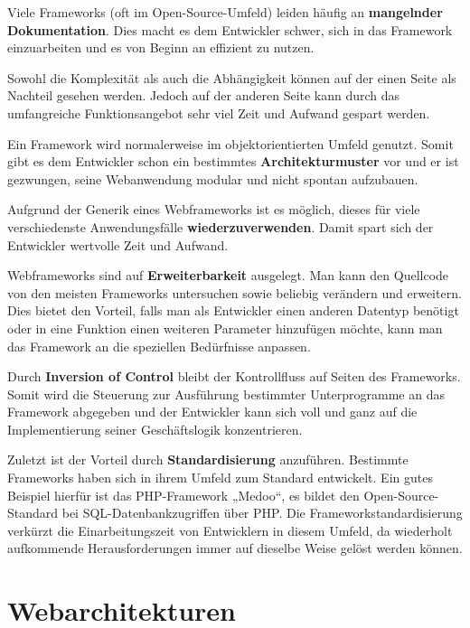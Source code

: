Viele Frameworks (oft im Open-Source-Umfeld) leiden häufig an \textbf{mangelnder Dokumentation}. Dies macht es dem Entwickler schwer, sich in das Framework einzuarbeiten und es von Beginn an effizient zu nutzen.

Sowohl die Komplexität als auch die Abhängigkeit können auf der einen Seite als Nachteil gesehen werden. Jedoch auf der anderen Seite kann durch das umfangreiche Funktionsangebot sehr viel Zeit und Aufwand gespart werden.

Ein Framework wird normalerweise im objektorientierten Umfeld genutzt. Somit gibt es dem Entwickler schon ein bestimmtes \textbf{Architekturmuster} vor und er ist gezwungen, seine Webanwendung modular und nicht spontan aufzubauen.

Aufgrund der Generik eines Webframeworks ist es möglich, dieses für viele verschiedenste Anwendungsfälle \textbf{wiederzuverwenden}. Damit spart sich der Entwickler wertvolle Zeit und Aufwand.

Webframeworks sind auf \textbf{Erweiterbarkeit} ausgelegt. Man kann den Quellcode von den meisten Frameworks untersuchen sowie beliebig verändern und erweitern. Dies bietet den Vorteil, falls man als Entwickler einen anderen Datentyp benötigt oder in eine Funktion einen weiteren Parameter hinzufügen möchte, kann man das Framework an die speziellen Bedürfnisse anpassen.

Durch \textbf{Inversion of Control} bleibt der Kontrollfluss auf Seiten des Frameworks. Somit wird die Steuerung zur Ausführung bestimmter Unterprogramme an das Framework abgegeben und der Entwickler kann sich voll und ganz auf die Implementierung seiner Geschäftslogik konzentrieren.

Zuletzt ist der Vorteil durch \textbf{Standardisierung} anzuführen. Bestimmte Frameworks haben sich in ihrem Umfeld zum Standard entwickelt. Ein gutes Beispiel hierfür ist das PHP-Framework „Medoo“, es bildet den Open-Source-Standard bei SQL-Datenbankzugriffen über PHP. Die Frameworkstandardisierung verkürzt die Einarbeitungszeit von Entwicklern in diesem Umfeld, da wiederholt aufkommende Herausforderungen immer auf dieselbe Weise gelöst werden können.\autocites[vgl.][313\psqq]{Schatten2010}

\section{Webarchitekturen}\label{sec:webarchitekturen}

